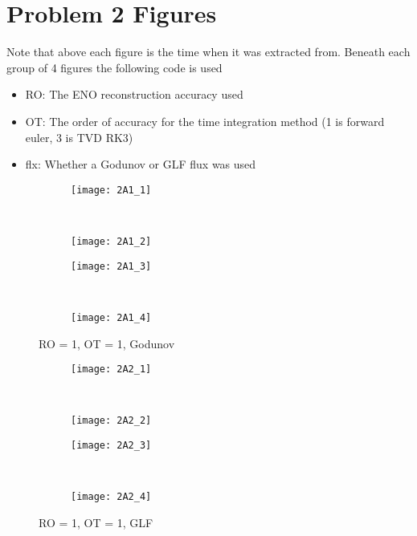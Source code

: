 \documentclass[10pt,letterpaper,fleqn]{article}
\begin{document}
\section{Problem 2 Figures}\label{app:FVM}
Note that above each figure is the time when it was extracted from.
Beneath each group of 4 figures the following code is used
\begin{itemize}
	\item RO: The ENO reconstruction accuracy used
	\item OT: The order of accuracy for the time integration method (1 is forward euler, 3 is TVD RK3)
	\item flx: Whether a Godunov or GLF flux was used 
\end{itemize}

\begin{figure}[h!]
        \centering
        \begin{subfigure}[b]{0.4\textwidth}
                \texttt{[image: 2A1\_1]}
        \end{subfigure}%
        ~ 
        \begin{subfigure}[b]{0.4\textwidth}
                \texttt{[image: 2A1\_2]}
        \end{subfigure}
        
        \begin{subfigure}[b]{0.4\textwidth}
                \texttt{[image: 2A1\_3]}
        \end{subfigure}
        ~
        \begin{subfigure}[b]{0.4\textwidth}
                \texttt{[image: 2A1\_4]}
        \end{subfigure}
        \caption{RO = 1, OT = 1, Godunov}
\end{figure}

\begin{figure}[h!]
        \centering
        \begin{subfigure}[b]{0.4\textwidth}
                \texttt{[image: 2A2\_1]}
        \end{subfigure}%
        ~ 
        \begin{subfigure}[b]{0.4\textwidth}
                \texttt{[image: 2A2\_2]}
        \end{subfigure}
        
        \begin{subfigure}[b]{0.4\textwidth}
                \texttt{[image: 2A2\_3]}
        \end{subfigure}
        ~
        \begin{subfigure}[b]{0.4\textwidth}
                \texttt{[image: 2A2\_4]}
        \end{subfigure}
        \caption{RO = 1, OT = 1, GLF}
\end{figure}
\end{document}

